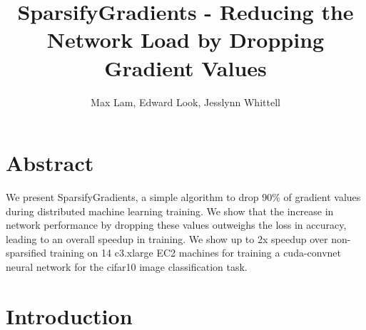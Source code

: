 \documentclass[10pt]{article}
\author{Max Lam, Edward Look, Jesslynn Whittell}
\date{}
\title{SparsifyGradients - Reducing the Network Load by Dropping Gradient Values}
\begin{document}
\maketitle

\section{Abstract}
\label{sec-1}

We present SparsifyGradients, a simple algorithm to drop 90\% of
gradient values during distributed machine learning training. We show
that the increase in network performance by dropping these values
outweighs the loss in accuracy, leading to an overall speedup in
training. We show up to 2x speedup over non-sparsified training on 14
c3.xlarge EC2 machines for training a cuda-convnet neural network for
the cifar10 image classification task.

\section{Introduction}
\label{sec-2}
\end{document}
